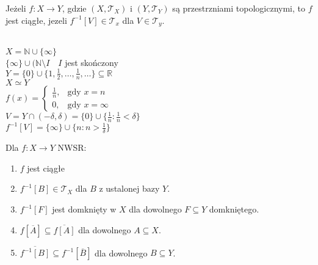 \begin{df} 
    Jeżeli $f: X \to Y$, gdzie $(X,\mathcal T _X)$ i $(Y,\mathcal T_Y)$ są przestrzniami topologicznymi, to 
    $f$ jest ciągłe, jezeli $f^{-1}[V] \in \mathcal T_x$ dla $V \in \mathcal T_y$.
\end{df} 
\begin{prz} ~\\ 
    $X = \mathbb N \cup \{\infty\}$ \\ 
    $\{ \infty \} \cup (\mathbb N \setminus I \quad I$ jest skończony \\
    $Y = \{0\} \cup \{1,\frac{1}{2},\ldots,\frac{1}{n},\ldots\} \subseteq \mathbb R$ \\ 
    $X \simeq Y$ \\ 
    $f(x) = \begin{cases} \frac{1}{n}, &\text{gdy } x = n \\ 0, &\text{gdy }  x = \infty \end{cases}$\\
    $V = Y \cap (-\delta,\delta) = \{0\} \cup \{\frac{1}{n}: \frac{1}{n} < \delta\}$ \\ 
    $f^{-1}[V] = \{\infty\} \cup \{n: n > \frac{1}{\delta}\}$
\end{prz}
\begin{tw} 
    Dla $f: X \to Y$ NWSR: 
    \begin{enumerate}[(1)]
        \item $f$ jest ciągłe
        \item $f^{-1} [B] \in \mathcal T_X$ dla $B$ z ustalonej bazy $Y$.
        \item $f^{-1} [F]$ jest domknięty w $X$ dla dowolnego $F \subseteq Y$ domkniętego. 
        \item $f[\overline A] \subseteq \overline{f[A]}$ dla dowolnego $A \subseteq X$.
        \item $\overline{f^{-1}[B]} \subseteq f^{-1}[\overline B]$ dla dowolnego $B \subseteq Y$. 
    \end{enumerate} 
\end{tw} 
